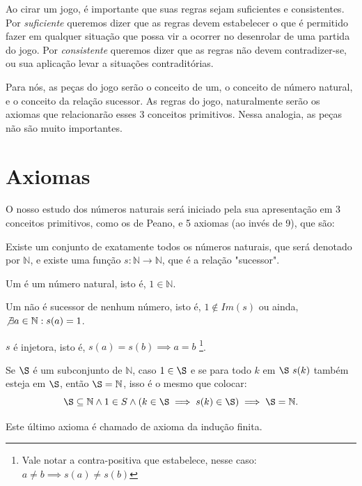 \documentclass[../main.tex]{subfiles}
\begin{document}
\begin{displayquote} Ao cirar um jogo, é importante que suas regras sejam suficientes e consistentes. Por \emph{suficiente} queremos dizer que as regras devem estabelecer o que é permitido fazer em qualquer situação que possa vir a ocorrer no desenrolar de uma partida do jogo. Por \emph{consistente} queremos dizer que as regras não devem contradizer-se, ou sua aplicação levar a situações contraditórias. \Parencite[p. 13-14]{barbosa}
\end{displayquote}

Para nós, as peças do jogo serão o conceito de um, o conceito de número natural, e o conceito da relação sucessor. As regras do jogo, naturalmente serão os axiomas que relacionarão esses 3 conceitos primitivos. Nessa analogia, as peças não são muito importantes.

\section{Axiomas}
O nosso estudo dos números naturais será iniciado pela sua apresentação em 3 conceitos primitivos, como os de Peano, e 5 axiomas (ao invés de 9), que são:

\begin{axi}\label{axi-existe-n-s}
    Existe um conjunto de exatamente todos os números naturais, que será denotado por $\mathbb{N}$, e existe uma função $s: \mathbb{N} \rightarrow \mathbb{N}$, que é a relação "sucessor". 
\end{axi}
\begin{axi}\label{axi-um-natural}
    Um é um número natural, isto é, $1 \in \mathbb{N}$.
\end{axi}
\begin{axi}\label{axi-um-nao-sucessor}
    Um não é sucessor de nenhum número, isto é, $1 \not \in Im(s)$ ou ainda, $\not \exists a \in \mathbb{N} : s(a) = 1$.
\end{axi}
\begin{axi}\label{axi-s-injetora}
    $s$ é injetora, isto é, $s(a) = s(b) \implies a = b$ \footnote{Vale notar a contra-positiva que estabelece, nesse caso: $a \neq b \implies s(a) \neq s(b)$}.
\end{axi}
\begin{axi}\label{axi-ind-finita}
    Se $\S$ é um subconjunto de $\mathbb{N}$, caso $1 \in \S$ e se para todo $k$ em $\S\ s(k)$ também esteja em $\S$, então $\S = \mathbb{N}$, isso é o mesmo que colocar: \\
     \[ \S \subseteq \mathbb{N} \land 1 \in S \land ( k \in \S \implies s(k) \in \S) \implies \S = \mathbb{N} .\]
\end{axi}
Este último axioma é chamado de axioma da indução finita.
\end{document}
